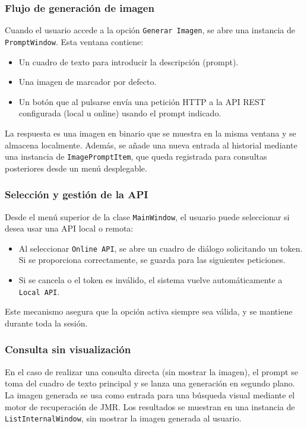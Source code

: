 \subsubsection{Flujo de generación de imagen}

Cuando el usuario accede a la opción \texttt{Generar Imagen}, se abre una instancia de \texttt{PromptWindow}. Esta ventana contiene:

\begin{itemize}
    \item Un cuadro de texto para introducir la descripción (prompt).
    \item Una imagen de marcador por defecto.
    \item Un botón que al pulsarse envía una petición HTTP a la API REST configurada (local u online) usando el prompt indicado.
\end{itemize}

La respuesta es una imagen en binario que se muestra en la misma ventana y se almacena localmente. Además, se añade una nueva entrada al historial mediante una instancia de \texttt{ImagePromptItem}, que queda registrada para consultas posteriores desde un menú desplegable.

\subsubsection{Selección y gestión de la API}

Desde el menú superior de la clase \texttt{MainWindow}, el usuario puede seleccionar si desea usar una API local o remota:

\begin{itemize}
    \item Al seleccionar \texttt{Online API}, se abre un cuadro de diálogo solicitando un token. Si se proporciona correctamente, se guarda para las siguientes peticiones.
    \item Si se cancela o el token es inválido, el sistema vuelve automáticamente a \texttt{Local API}.
\end{itemize}

Este mecanismo asegura que la opción activa siempre sea válida, y se mantiene durante toda la sesión.

\subsubsection{Consulta sin visualización}

En el caso de realizar una consulta directa (sin mostrar la imagen), el prompt se toma del cuadro de texto principal y se lanza una generación en segundo plano. La imagen generada se usa como entrada para una búsqueda visual mediante el motor de recuperación de JMR. Los resultados se muestran en una instancia de \texttt{ListInternalWindow}, sin mostrar la imagen generada al usuario.

